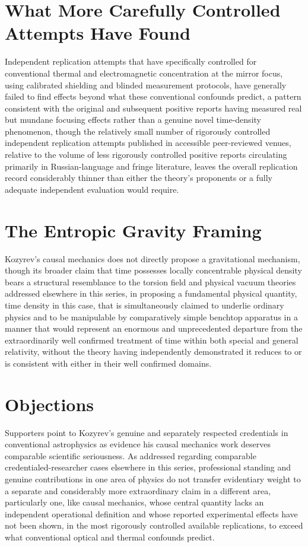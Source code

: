 \documentclass[11pt]{article}
\begin{document}
\section{What More Carefully Controlled Attempts Have Found}

Independent replication attempts that have specifically controlled for conventional thermal and electromagnetic concentration at the mirror focus, using calibrated shielding and blinded measurement protocols, have generally failed to find effects beyond what these conventional confounds predict, a pattern consistent with the original and subsequent positive reports having measured real but mundane focusing effects rather than a genuine novel time-density phenomenon, though the relatively small number of rigorously controlled independent replication attempts published in accessible peer-reviewed venues, relative to the volume of less rigorously controlled positive reports circulating primarily in Russian-language and fringe literature, leaves the overall replication record considerably thinner than either the theory's proponents or a fully adequate independent evaluation would require.

\section{The Entropic Gravity Framing}

Kozyrev's causal mechanics does not directly propose a gravitational mechanism, though its broader claim that time possesses locally concentrable physical density bears a structural resemblance to the torsion field and physical vacuum theories addressed elsewhere in this series, in proposing a fundamental physical quantity, time density in this case, that is simultaneously claimed to underlie ordinary physics and to be manipulable by comparatively simple benchtop apparatus in a manner that would represent an enormous and unprecedented departure from the extraordinarily well confirmed treatment of time within both special and general relativity, without the theory having independently demonstrated it reduces to or is consistent with either in their well confirmed domains.

\section{Objections}

Supporters point to Kozyrev's genuine and separately respected credentials in conventional astrophysics as evidence his causal mechanics work deserves comparable scientific seriousness. As addressed regarding comparable credentialed-researcher cases elsewhere in this series, professional standing and genuine contributions in one area of physics do not transfer evidentiary weight to a separate and considerably more extraordinary claim in a different area, particularly one, like causal mechanics, whose central quantity lacks an independent operational definition and whose reported experimental effects have not been shown, in the most rigorously controlled available replications, to exceed what conventional optical and thermal confounds predict.
\end{document}
